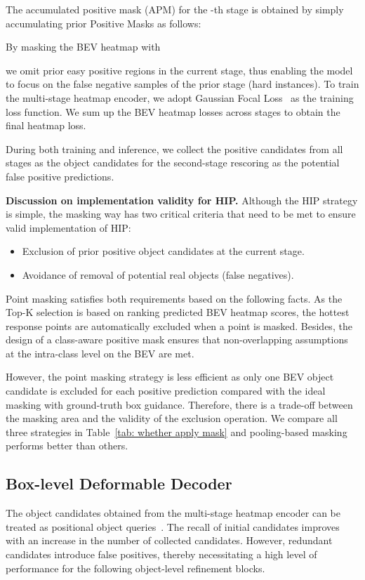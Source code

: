 \documentclass[10pt,twocolumn,letterpaper]{article}
\begin{document}
The accumulated positive mask (APM) for the -th stage is obtained by simply accumulating prior Positive Masks as follows:

By masking the BEV heatmap  with 

we omit prior easy positive regions in the current stage, thus enabling the model to focus on the false negative samples of the prior stage (hard instances). To train the multi-stage heatmap encoder, we adopt Gaussian Focal Loss~\cite{transfusion} as the training loss function. We sum up the BEV heatmap losses across stages to obtain the final heatmap loss.



During both training and inference, we collect the positive candidates from all stages as the object candidates for the second-stage rescoring as the potential false positive predictions. 


\vspace{1mm}
\noindent\textbf{Discussion on implementation validity for HIP.} 
Although the HIP strategy is simple, the masking way has two critical criteria that need to be met to ensure valid implementation of HIP: 
\begin{itemize} 
    \item Exclusion of prior positive object candidates at the current stage. 
    \item Avoidance of removal of potential real objects (false negatives). 
\end{itemize}
Point masking satisfies both requirements based on the following facts. As the Top-K selection is based on ranking predicted BEV heatmap scores, the hottest response points are automatically excluded when a point is masked. Besides, the design of a class-aware positive mask ensures that non-overlapping assumptions at the intra-class level on the BEV are met. 

However, the point masking strategy is less efficient as only one BEV object candidate is excluded for each positive prediction compared with the ideal masking with ground-truth box guidance. Therefore, there is a trade-off between the masking area and the validity of the exclusion operation. We compare all three strategies in Table~\ref{tab: whether apply mask} and pooling-based masking performs better than others.







\subsection{Box-level Deformable Decoder}
\label{sec:decoder}
The object candidates obtained from the multi-stage heatmap encoder can be treated as positional object queries~\cite{efficientdetr, transfusion}. The recall of initial candidates improves with an increase in the number of collected candidates. However, redundant candidates introduce false positives, thereby necessitating a high level of performance for the following object-level refinement blocks. 
\end{document}
